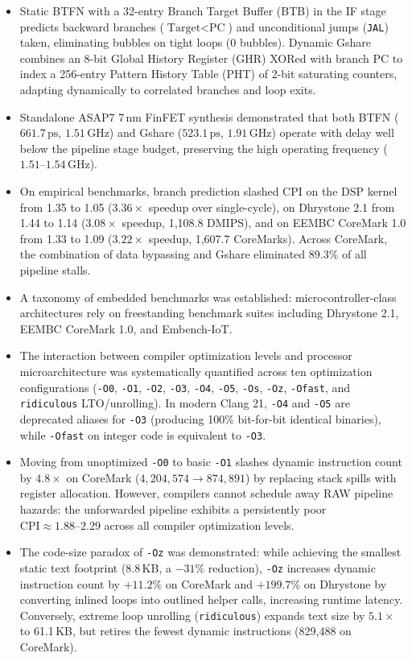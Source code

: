 \begin{itemize}
    \item Static BTFN with a 32-entry Branch Target Buffer (BTB) in the IF stage predicts backward branches ($\text{Target} < \text{PC}$) and unconditional jumps (\texttt{JAL}) taken, eliminating bubbles on tight loops (0 bubbles). Dynamic Gshare combines an 8-bit Global History Register (GHR) XORed with branch PC to index a 256-entry Pattern History Table (PHT) of 2-bit saturating counters, adapting dynamically to correlated branches and loop exits.
    \item Standalone ASAP7 7\,nm FinFET synthesis demonstrated that both BTFN ($661.7\,\text{ps}$, $1.51\,\text{GHz}$) and Gshare ($523.1\,\text{ps}$, $1.91\,\text{GHz}$) operate with delay well below the pipeline stage budget, preserving the high operating frequency ($1.51\text{--}1.54\,\text{GHz}$).
    \item On empirical benchmarks, branch prediction slashed CPI on the DSP kernel from 1.35 to 1.05 ($\mathbf{3.36\times}$ speedup over single-cycle), on Dhrystone 2.1 from 1.44 to 1.14 ($\mathbf{3.08\times}$ speedup, 1,108.8 DMIPS), and on EEMBC CoreMark 1.0 from 1.33 to 1.09 ($\mathbf{3.22\times}$ speedup, 1,607.7 CoreMarks). Across CoreMark, the combination of data bypassing and Gshare eliminated 89.3\% of all pipeline stalls.
    \item A taxonomy of embedded benchmarks was established: microcontroller-class architectures rely on freestanding benchmark suites including Dhrystone 2.1, EEMBC CoreMark 1.0, and Embench-IoT.
    \item The interaction between compiler optimization levels and processor microarchitecture was systematically quantified across ten optimization configurations (\texttt{-O0}, \texttt{-O1}, \texttt{-O2}, \texttt{-O3}, \texttt{-O4}, \texttt{-O5}, \texttt{-Os}, \texttt{-Oz}, \texttt{-Ofast}, and \texttt{ridiculous} LTO/unrolling). In modern Clang 21, \texttt{-O4} and \texttt{-O5} are deprecated aliases for \texttt{-O3} (producing 100\% bit-for-bit identical binaries), while \texttt{-Ofast} on integer code is equivalent to \texttt{-O3}.
    \item Moving from unoptimized \texttt{-O0} to basic \texttt{-O1} slashes dynamic instruction count by $4.8\times$ on CoreMark ($4,204,574 \to 874,891$) by replacing stack spills with register allocation. However, compilers cannot schedule away RAW pipeline hazards: the unforwarded pipeline exhibits a persistently poor $\text{CPI} \approx 1.88\text{--}2.29$ across all compiler optimization levels.
    \item The code-size paradox of \texttt{-Oz} was demonstrated: while achieving the smallest static text footprint (8.8\,KB, a $-31\%$ reduction), \texttt{-Oz} increases dynamic instruction count by $+11.2\%$ on CoreMark and $+199.7\%$ on Dhrystone by converting inlined loops into outlined helper calls, increasing runtime latency. Conversely, extreme loop unrolling (\texttt{ridiculous}) expands text size by $5.1\times$ to 61.1\,KB, but retires the fewest dynamic instructions (829,488 on CoreMark).

\end{itemize}
